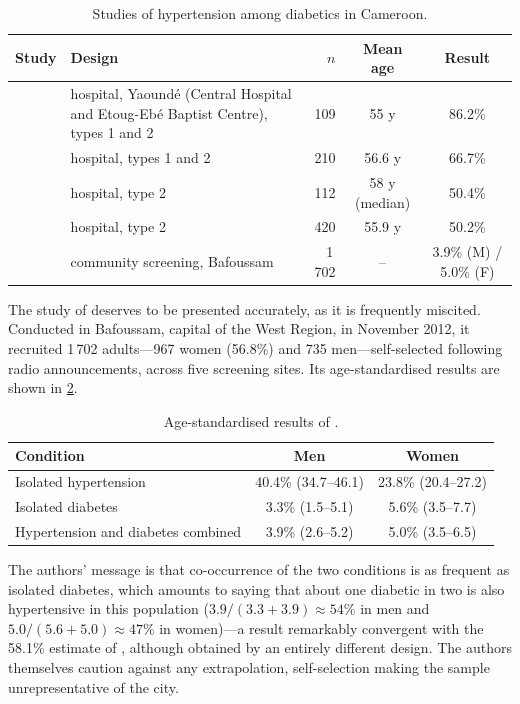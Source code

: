 \documentclass[12pt,a4paper,oneside]{report}
\begin{document}
\begin{table}[htbp]
\centering\footnotesize
\caption{Studies of hypertension among diabetics in Cameroon.}\label{tab:cameroon-comorbidity}
\begin{tabularx}{\textwidth}{@{}>{\raggedright\arraybackslash}p{2.6cm} >{\raggedright\arraybackslash}X r c c@{}}
\toprule
\textbf{Study} & \textbf{Design} & \textbf{$n$} & \textbf{Mean age} & \textbf{Result} \\
\midrule
\textcite{kemche2020} & hospital, Yaoundé (Central Hospital and Etoug-Ebé Baptist Centre), types 1 and 2 & 109 & 55 y & 86.2\% \\
\textcite{choukem2007} & hospital, types 1 and 2 & 210 & 56.6 y & 66.7\% \\
\textcite{mfeukeu2022} & hospital, type 2 & 112 & 58 y (median) & 50.4\% \\
\textcite{dzudie2012} & hospital, type 2 & 420 & 55.9 y & 50.2\% \\
\textcite{katte2014} & community screening, Bafoussam & 1\,702 & -- & 3.9\% (M) / 5.0\% (F) \\
\bottomrule
\end{tabularx}
\end{table}

The study of \textcite{katte2014} deserves to be presented accurately, as it is frequently miscited. Conducted in Bafoussam, capital of the West Region, in November 2012, it recruited 1\,702 adults---967 women (56.8\%) and 735 men---self-selected following radio announcements, across five screening sites. Its age-standardised results are shown in \cref{tab:katte}.

\begin{table}[htbp]
\centering\small
\caption{Age-standardised results of \textcite{katte2014}.}\label{tab:katte}
\begin{tabular}{@{}lcc@{}}
\toprule
\textbf{Condition} & \textbf{Men} & \textbf{Women} \\
\midrule
Isolated hypertension & 40.4\% (34.7--46.1) & 23.8\% (20.4--27.2) \\
Isolated diabetes & 3.3\% (1.5--5.1) & 5.6\% (3.5--7.7) \\
Hypertension and diabetes combined & 3.9\% (2.6--5.2) & 5.0\% (3.5--6.5) \\
\bottomrule
\end{tabular}
\end{table}

The authors' message is that co-occurrence of the two conditions is as frequent as isolated diabetes, which amounts to saying that about one diabetic in two is also hypertensive in this population ($3.9/(3.3+3.9)\approx 54\%$ in men and $5.0/(5.6+5.0)\approx 47\%$ in women)---a result remarkably convergent with the 58.1\% estimate of \textcite{hinneh2023}, although obtained by an entirely different design. The authors themselves caution against any extrapolation, self-selection making the sample unrepresentative of the city.
\end{document}
